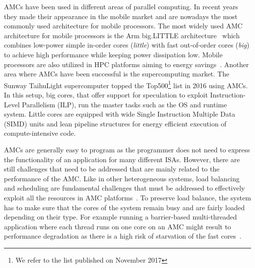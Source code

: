 AMCs have been used in different areas of parallel computing. 
In recent years they made their appearance in the mobile market and are nowadays the most commonly used architecture for mobile processors.
The most widely used AMC architecture for mobile processors is the Arm big.LITTLE architecture~\cite{Greenhalgh2011} which combines low-power simple in-order cores (\emph{little}) with fast out-of-order cores (\emph{big}) to achieve high performance while keeping power dissipation low.
Mobile processors are also utilized in HPC platforms aiming to energy savings~\cite{ARMV8}.
Another area where AMCs have been successful is the supercomputing market.
The Sunway TaihuLight supercomputer topped the Top500\footnote{We refer to the list published on November 2017} list in 2016 using AMCs. 
In this setup, big cores, that offer support for speculation to exploit Instruction-Level Parallelism (ILP), run the master tasks such as the OS and runtime system.
Little cores are equipped with wide Single Instruction Multiple Data (SIMD) units and lean pipeline structures for energy efficient execution of compute-intensive code. 

AMCs are generally easy to program as the programmer does not need to express the functionality of an application for many different ISAs. 
However, there are still challenges that need to be addressed that are mainly related to the performance of the AMC.
Like in other heterogeneous systems, load balancing and scheduling are fundamental challenges that must be addressed to effectively exploit all the resources in AMC platforms~\cite{Suleman:APLOS2009,Fedorova2009,Greenhalgh2011,Joao:ASPLOS2012,Joao:ISCA2013,ARM4HPC_SC13}. 
To preserve load balance, the system has to make sure that the cores of the system remain busy and are fairly loaded depending on their type.
For example running a barrier-based multi-threaded application where each thread runs on one core on an AMC might result to performance degradation as there is a high risk of starvation of the fast cores~\cite{AMC_survey}. %

